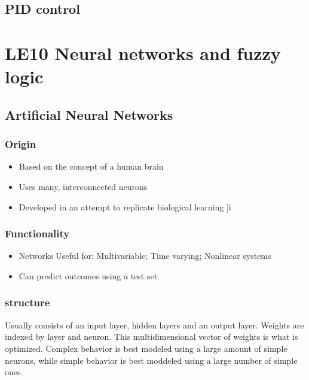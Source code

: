 \documentclass{report}
\begin{document}
	\section{PID control}

	

	
	

\chapter{LE10 Neural networks and fuzzy logic}
\section{Artificial Neural Networks}
\subsection{Origin}
\begin{itemize}
	\item{Based on the concept of a human brain}
	\item{Uses many, interconnected neurons} 
	\item {Developed in an attempt to replicate biological learning}
	]i
\end{itemize}
\subsection{Functionality}
\begin{itemize}
	\item Networks Useful for:
		\subitem Multivariable; 
		\subitem Time varying;
		\subitem Nonlinear systems
	\item Can predict outcomes using a test set. 
\end{itemize}
\subsection{structure}
Usually consists of an input layer, hidden layers and an output layer. Weights are indexed by layer and neuron. This multidimensional vector of weights is what is optimized. 
Complex behavior is best modeled using a large amount of simple neurons, while simple behavior is best moddeled using a large number of simple ones. 
\end{document}
